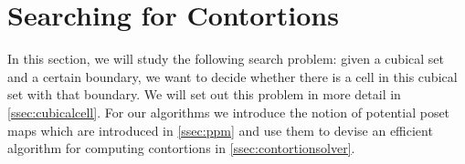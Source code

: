 \documentclass{llncs}
\newcommand{\todo}[1]{
  \begin{tcolorbox}
    TODO {#1} 
  \end{tcolorbox}
}
\newcommand{\pint}[1]{\mathbf{1}^{#1}}
\renewcommand{\dim}[1]{\mathsf{dim}({#1})}
\newcommand{\cont}[2]{\ensuremath{ \ifthenelse{\equal{#2}{}}{#1}{{#1}\langle{#2}\rangle}} }
\newcommand{\boundary}[1]{\partial({#1})}
\begin{document}










\section{Searching for Contortions}
\label{sec:contortionsolver}

In this section, we will study the following search problem: given a cubical set
and a certain boundary, we want to decide whether there is a cell in this
cubical set with that boundary. We will set out this problem in more detail in
\autoref{ssec:cubicalcell}. For our algorithms we introduce the notion of
potential poset maps which are introduced in \autoref{ssec:ppm} and use them to
devise an efficient algorithm for computing contortions in
\autoref{ssec:contortionsolver}. 
\end{document}
